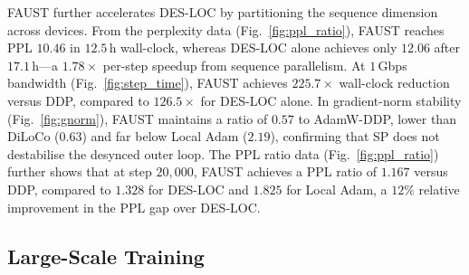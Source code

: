 \documentclass{article}
\begin{document}
FAUST further accelerates DES-LOC by partitioning the sequence dimension across devices.
From the perplexity data (Fig.~\ref{fig:ppl_ratio}), FAUST  reaches PPL $10.46$ in $12.5$\,h wall-clock,
whereas DES-LOC alone achieves only $12.06$ after $17.1$\,h---a $1.78\times$ per-step speedup from sequence parallelism.
At $1$\,Gbps bandwidth (Fig.~\ref{fig:step_time}), FAUST achieves $225.7\times$ wall-clock reduction versus DDP,
compared to $126.5\times$ for DES-LOC alone. In gradient-norm stability (Fig.~\ref{fig:gnorm}), FAUST
maintains a ratio of $0.57$ to AdamW-DDP, lower than DiLoCo ($0.63$) and far below Local Adam ($2.19$),
confirming that SP does not destabilise the desynced outer loop.
The PPL ratio data (Fig.~\ref{fig:ppl_ratio}) further shows that at step $20{,}000$, FAUST achieves
a PPL ratio of $1.167$ versus DDP, compared to $1.328$ for DES-LOC and $1.825$ for Local Adam, a
$12\%$ relative improvement in the PPL gap over DES-LOC.



\vspace{-6pt}
\subsection{Large-Scale Training }
\label{sec:rq4}
\end{document}
